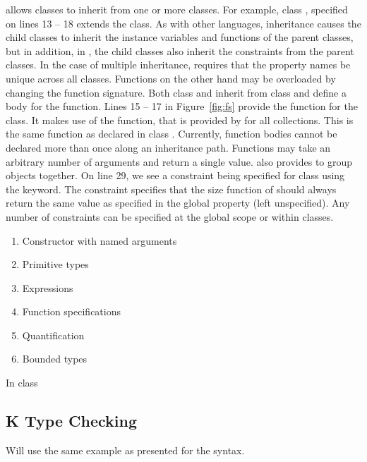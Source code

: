 \Klang{} allows classes to inherit from one or more classes. For
example, class , specified on lines 13 -- 18 extends the
 class. As with other languages, inheritance causes the
child classes to inherit the instance variables and functions of the
parent classes, but in addition, in \Klang{}, the child classes also
inherit the constraints from the parent classes. In the case of
multiple inheritance, \Klang{} requires that the property names be
unique across all classes. Functions on the other hand may be
overloaded by changing the function signature. Both class 
and  inherit from class  and define a body for
the  function. Lines 15 -- 17 in Figure~\ref{fig:fs}
provide the  function for the  class. It makes
use of the  function, that is provided by \Klang{} for all
collections. This is the same function as declared in class
. Currently, function bodies cannot be declared more than
once along an inheritance path. Functions may take an arbitrary number
of arguments and return a single value. \Klang{} also provides
 to group objects together. On line 29, we see a
constraint being specified for class  using the 
keyword. The constraint specifies that the size function of
 should always return the same value as specified in the
global property  (left unspecified). Any number
of constraints can be specified at the global scope or within classes. 

\begin{enumerate}
\item Constructor with named arguments
\item Primitive types
\item Expressions
\item Function specifications
\item Quantification
\item Bounded types
\end{enumerate}

In class 

\subsection{K Type Checking}

Will use the same example as presented for the syntax.
